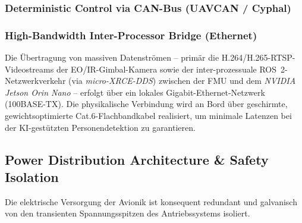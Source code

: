\subsubsection{Deterministic Control via CAN-Bus (UAVCAN / Cyphal)}

\subsubsection{High-Bandwidth Inter-Processor Bridge (Ethernet)}
Die Übertragung von massiven Datenströmen – primär die H.264/H.265-RTSP-Videostreams der EO/IR-Gimbal-Kamera sowie der inter-prozessuale ROS~2-Netzwerkverkehr (via \textit{micro-XRCE-DDS}) zwischen der FMU und dem \textit{NVIDIA Jetson Orin Nano} – erfolgt über ein lokales Gigabit-Ethernet-Netzwerk (100BASE-TX). Die physikalische Verbindung wird an Bord über geschirmte, gewichtsoptimierte Cat.6-Flachbandkabel realisiert, um minimale Latenzen bei der KI-gestützten Personendetektion zu garantieren.

\subsection{Power Distribution Architecture \texorpdfstring{\&}{\&} Safety Isolation}
\label{sec:power_distribution}

Die elektrische Versorgung der Avionik ist konsequent redundant und galvanisch von den transienten Spannungsspitzen des Antriebssystems isoliert.

